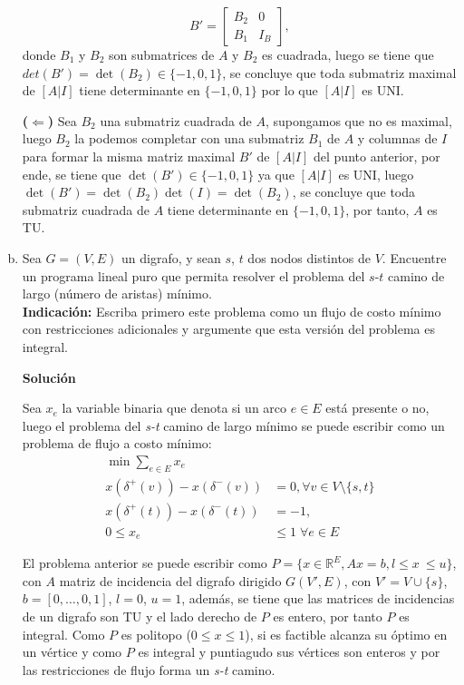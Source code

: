 \documentclass{article}
\theoremstyle{plain}
\theoremstyle{definition}
\theoremstyle{Azul}
\begin{document}
\begin{enumerate}[(a)]
\[
B'=
\left[
\begin{array}{cc}
B_{2} & 0 \\
B_{1} & I_{B}
\end{array}
\right],
\]
donde $B_{1}$ y $B_{2}$ son submatrices de $A$ y $B_{2}$ es cuadrada, luego se tiene que $det(B')=\det(B_{2})\in \{-1, 0, 1\}$, se concluye que toda submatriz maximal de $[A|I]$ tiene determinante en $\{-1,0,1\}$ por lo que $[A|I]$ es UNI.

\textbf{($\Longleftarrow$)} Sea $B_{2}$ una submatriz cuadrada de $A$, supongamos que no es maximal, luego $B_{2}$ la podemos completar con una submatriz $B_{1}$ de $A$ y columnas de $I$ para formar la misma matriz maximal $B'$ de $[A|I]$ del punto anterior, por ende, se tiene que $\det(B') \in \{-1, 0, 1\}$ ya que $[A|I]$ es UNI, luego $\det(B') = \det(B_{2})\det(I) = \det(B_{2})$, se concluye que toda submatriz cuadrada de $A$ tiene determinante en $\{-1,0,1\}$, por tanto, $A$ es TU.


\item Sea $G=(V,E)$ un digrafo, y sean $s$, $t$ dos nodos distintos de $V$. Encuentre un programa lineal puro que permita resolver el problema del $s$-$t$ camino de largo (número de aristas) mínimo.\\ \textbf{Indicación:} Escriba primero este problema como un flujo de costo mínimo con restricciones adicionales y argumente que esta versión del problema es integral.

\textbf{Solución}

Sea $x_{e}$ la variable binaria que denota si un arco $e\in E$ está presente o no, luego el problema del \textit{s-t} camino de largo mínimo se puede escribir como un problema de flujo a costo mínimo:
\begin{align*}
    \min \sum_{e\in E}x_{e}\\
    x(\delta^{+}(v))-x(\delta^{-}(v))&=0, \forall v \in V\setminus \{s,t\}\\
    x(\delta^{+}(t))-x(\delta^{-}(t))&=-1, \\
    0\leq x_{e}&\leq 1 \; \forall e\in E
\end{align*}

El problema anterior se puede escribir como $P=\{x\in \mathbb{R}^{E}, Ax=b, l\leq x\ \leq u\}$, con $A$ matriz de incidencia del digrafo dirigido $G(V', E)$, con $V'=V\cup\{s\}$, $b=[0,\ldots, 0, 1]$, $l=0$, $u=1$, además, se tiene que las matrices de incidencias de un digrafo son TU y el lado derecho de $P$ es entero, por tanto $P$ es integral. Como $P$ es politopo ($0\leq x \leq 1$), si es factible alcanza su óptimo en un vértice y como $P$ es integral y puntiagudo sus vértices son enteros y por las restricciones de flujo forma un \textit{s-t} camino.


\end{enumerate}
\end{document}
